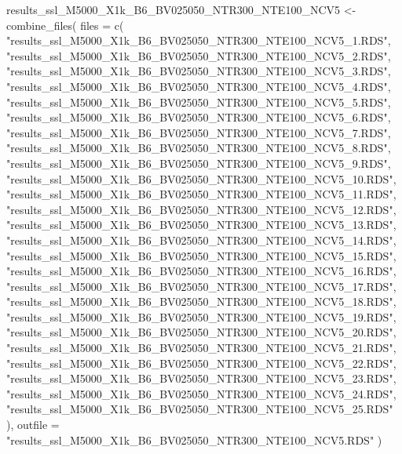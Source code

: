 \documentclass[
]{article}
\newenvironment{Shaded}{\begin{snugshade}}{\end{snugshade}}
\newcommand{\AttributeTok}[1]{\textcolor[rgb]{0.77,0.63,0.00}{#1}}
\newcommand{\FunctionTok}[1]{\textcolor[rgb]{0.00,0.00,0.00}{#1}}
\newcommand{\NormalTok}[1]{#1}
\newcommand{\OtherTok}[1]{\textcolor[rgb]{0.56,0.35,0.01}{#1}}
\newcommand{\StringTok}[1]{\textcolor[rgb]{0.31,0.60,0.02}{#1}}
\begin{document}
\begin{Shaded}
\begin{Highlighting}[]
\NormalTok{results\_ssl\_M5000\_X1k\_B6\_BV025050\_NTR300\_NTE100\_NCV5 }\OtherTok{\textless{}{-}} \FunctionTok{combine\_files}\NormalTok{(}
  \AttributeTok{files =} \FunctionTok{c}\NormalTok{(}
    \StringTok{"results\_ssl\_M5000\_X1k\_B6\_BV025050\_NTR300\_NTE100\_NCV5\_1.RDS"}\NormalTok{,}
    \StringTok{"results\_ssl\_M5000\_X1k\_B6\_BV025050\_NTR300\_NTE100\_NCV5\_2.RDS"}\NormalTok{,}
    \StringTok{"results\_ssl\_M5000\_X1k\_B6\_BV025050\_NTR300\_NTE100\_NCV5\_3.RDS"}\NormalTok{,}
    \StringTok{"results\_ssl\_M5000\_X1k\_B6\_BV025050\_NTR300\_NTE100\_NCV5\_4.RDS"}\NormalTok{,}
    \StringTok{"results\_ssl\_M5000\_X1k\_B6\_BV025050\_NTR300\_NTE100\_NCV5\_5.RDS"}\NormalTok{,}
    \StringTok{"results\_ssl\_M5000\_X1k\_B6\_BV025050\_NTR300\_NTE100\_NCV5\_6.RDS"}\NormalTok{,}
    \StringTok{"results\_ssl\_M5000\_X1k\_B6\_BV025050\_NTR300\_NTE100\_NCV5\_7.RDS"}\NormalTok{,}
    \StringTok{"results\_ssl\_M5000\_X1k\_B6\_BV025050\_NTR300\_NTE100\_NCV5\_8.RDS"}\NormalTok{,}
    \StringTok{"results\_ssl\_M5000\_X1k\_B6\_BV025050\_NTR300\_NTE100\_NCV5\_9.RDS"}\NormalTok{,}
    \StringTok{"results\_ssl\_M5000\_X1k\_B6\_BV025050\_NTR300\_NTE100\_NCV5\_10.RDS"}\NormalTok{,}
    \StringTok{"results\_ssl\_M5000\_X1k\_B6\_BV025050\_NTR300\_NTE100\_NCV5\_11.RDS"}\NormalTok{,}
    \StringTok{"results\_ssl\_M5000\_X1k\_B6\_BV025050\_NTR300\_NTE100\_NCV5\_12.RDS"}\NormalTok{,}
    \StringTok{"results\_ssl\_M5000\_X1k\_B6\_BV025050\_NTR300\_NTE100\_NCV5\_13.RDS"}\NormalTok{,}
    \StringTok{"results\_ssl\_M5000\_X1k\_B6\_BV025050\_NTR300\_NTE100\_NCV5\_14.RDS"}\NormalTok{,}
    \StringTok{"results\_ssl\_M5000\_X1k\_B6\_BV025050\_NTR300\_NTE100\_NCV5\_15.RDS"}\NormalTok{,}
    \StringTok{"results\_ssl\_M5000\_X1k\_B6\_BV025050\_NTR300\_NTE100\_NCV5\_16.RDS"}\NormalTok{,}
    \StringTok{"results\_ssl\_M5000\_X1k\_B6\_BV025050\_NTR300\_NTE100\_NCV5\_17.RDS"}\NormalTok{,}
    \StringTok{"results\_ssl\_M5000\_X1k\_B6\_BV025050\_NTR300\_NTE100\_NCV5\_18.RDS"}\NormalTok{,}
    \StringTok{"results\_ssl\_M5000\_X1k\_B6\_BV025050\_NTR300\_NTE100\_NCV5\_19.RDS"}\NormalTok{,}
    \StringTok{"results\_ssl\_M5000\_X1k\_B6\_BV025050\_NTR300\_NTE100\_NCV5\_20.RDS"}\NormalTok{,}
    \StringTok{"results\_ssl\_M5000\_X1k\_B6\_BV025050\_NTR300\_NTE100\_NCV5\_21.RDS"}\NormalTok{,}
    \StringTok{"results\_ssl\_M5000\_X1k\_B6\_BV025050\_NTR300\_NTE100\_NCV5\_22.RDS"}\NormalTok{,}
    \StringTok{"results\_ssl\_M5000\_X1k\_B6\_BV025050\_NTR300\_NTE100\_NCV5\_23.RDS"}\NormalTok{,}
    \StringTok{"results\_ssl\_M5000\_X1k\_B6\_BV025050\_NTR300\_NTE100\_NCV5\_24.RDS"}\NormalTok{,}
    \StringTok{"results\_ssl\_M5000\_X1k\_B6\_BV025050\_NTR300\_NTE100\_NCV5\_25.RDS"}
\NormalTok{  ),}
  \AttributeTok{outfile =} \StringTok{"results\_ssl\_M5000\_X1k\_B6\_BV025050\_NTR300\_NTE100\_NCV5.RDS"}
\NormalTok{)}


\end{Highlighting}
\end{Shaded}
\end{document}
